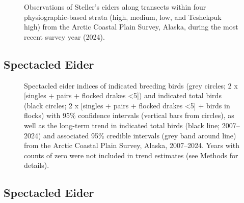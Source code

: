 \documentclass[
]{article}
\begin{document}
\begin{figure}


\caption{\label{fig-STEImap}Observations of Steller's eiders along
transects within four physiographic-based strata (high, medium, low, and
Teshekpuk high) from the Arctic Coastal Plain Survey, Alaska, during the
most recent survey year (2024).}

\end{figure}%

\newpage{}

\subsection*{Spectacled Eider}\label{spectacled-eider}

\begin{figure}


\caption{\label{fig-SPEI}Spectacled eider indices of indicated breeding
birds (grey circles; 2 x {[}singles + pairs + flocked drakes
\textless5{]}) and indicated total birds (black circles; 2 x {[}singles
+ pairs + flocked drakes \textless5{]} + birds in flocks) with 95\%
confidence intervals (vertical bars from circles), as well as the
long-term trend in indicated total birds (black line; 2007--2024) and
associated 95\% credible intervals (grey band around line) from the
Arctic Coastal Plain Survey, Alaska, 2007--2024. Years with counts of
zero were not included in trend estimates (see Methods for details).}

\end{figure}%

\newpage{}

\subsection*{Spectacled Eider}\label{spectacled-eider-1}

\begingroup\fontsize{10}{12}\selectfont
\end{document}
